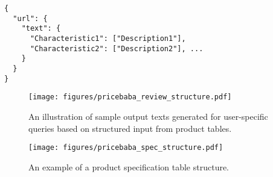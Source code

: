 \begin{lstlisting}[style=jsonstyle, frame = single, caption=JSON Data Format reviews, label=code:JSON-reviews]
{
  "url": {
    "text": {
      "Characteristic1": ["Description1"],
      "Characteristic2": ["Description2"], ...
    }
  }
}
\end{lstlisting}

\begin{figure*}[ht!]
    \centering
    \texttt{[image: figures/pricebaba\_review\_structure.pdf]}
    \caption{An illustration of sample output texts generated for user-specific queries based on structured input from product tables.}
    \label{fig:pricebaba-review-structure}
\end{figure*}


\begin{figure*}[ht!]
    \centering
    \texttt{[image: figures/pricebaba\_spec\_structure.pdf]}
    \caption{An example of a product specification table structure.}
    \label{fig:pricebaba-spec-structure}
\end{figure*}

